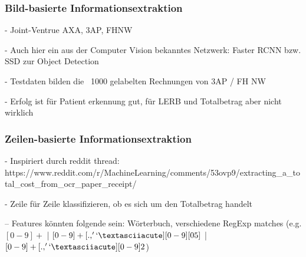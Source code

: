 \subsubsection{Bild-basierte Informationsextraktion}

- Joint-Ventrue AXA, 3AP, FHNW

- Auch hier ein aus der Computer Vision bekanntes Netzwerk: Faster RCNN bzw. SSD zur Object Detection

- Testdaten bilden die ~1000 gelabelten Rechnungen von 3AP / FH NW

- Erfolg ist für Patient erkennung gut, für LERB und Totalbetrag aber nicht wirklich 




\subsubsection{Zeilen-basierte Informationsextraktion}



- Inspiriert durch reddit thread: https://www.reddit.com/r/MachineLearning/comments/53ovp9/extracting\_a\_total\_cost\_from\_ocr\_paper\_receipt/

- Zeile für Zeile klassifizieren, ob es sich um den Totalbetrag handelt

-- Features könnten folgende sein: Wörterbuch, verschiedene RegExp matches (e.g. $[0-9]+$ | $[0-9]+[.,'`´ ][0-9][05]$ | $[0-9]+[.,'`´ ][0-9]{2}$)

